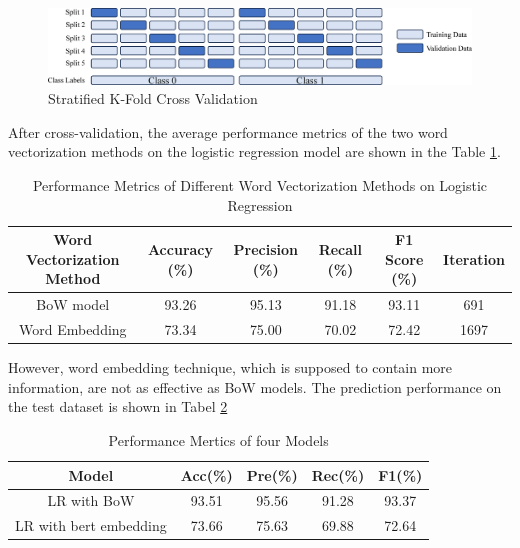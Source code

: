 \documentclass[ %
                    author={Bocheng Wang},
                supervisor={Dr. Qiang Liu},
                    degree={MSc},
                     title={A Research on Identification of Suicide Ideation in Texts with Multiple Models},
                      type={},
                      year={2024}]{dissertation}
\begin{document}
\begin{figure}[h]
      \centering
      \includegraphics[width=0.7\linewidth]{../img/cv.eps}
      \caption{Stratified K-Fold Cross Validation}
      \label{fig:cross validation}
\end{figure}

After cross-validation, the average performance metrics of the two word vectorization methods on the logistic regression model are shown in the Table \ref{tab:baseline}. 

\begin{table}[h]
      \centering
      \begin{tabular}{cccccc}
            \hline
            Word Vectorization Method & Accuracy (\%) & Precision (\%) & Recall (\%) & F1 Score (\%) & Iteration \\
            \hline
            BoW model      & 93.26 & 95.13 & 91.18 & 93.11 & 691    \\
            Word Embedding & 73.34 & 75.00 & 70.02 & 72.42 & 1697   \\
            \hline
      \end{tabular}
      \caption{Performance Metrics of Different Word Vectorization Methods on Logistic Regression}
      \label{tab:baseline}
\end{table}

However, word embedding technique, which is supposed to contain more information, are not as effective as BoW models. The prediction performance on the test dataset is shown in Tabel \ref{tab:lrperformance}

\begin{table}[!h]
      \centering
      \begin{tabular}{c|cccc}
            \hline
            Model & Acc(\%) & Pre(\%) & Rec(\%) & F1(\%) \\
            \hline
            LR with BoW             & 93.51 & 95.56 & 91.28 & 93.37 \\
            LR with bert embedding  & 73.66 & 75.63 & 69.88 & 72.64 \\
            \hline
      \end{tabular}
      \caption{Performance Mertics of four Models}
      \label{tab:lrperformance}
\end{table}
\end{document}

